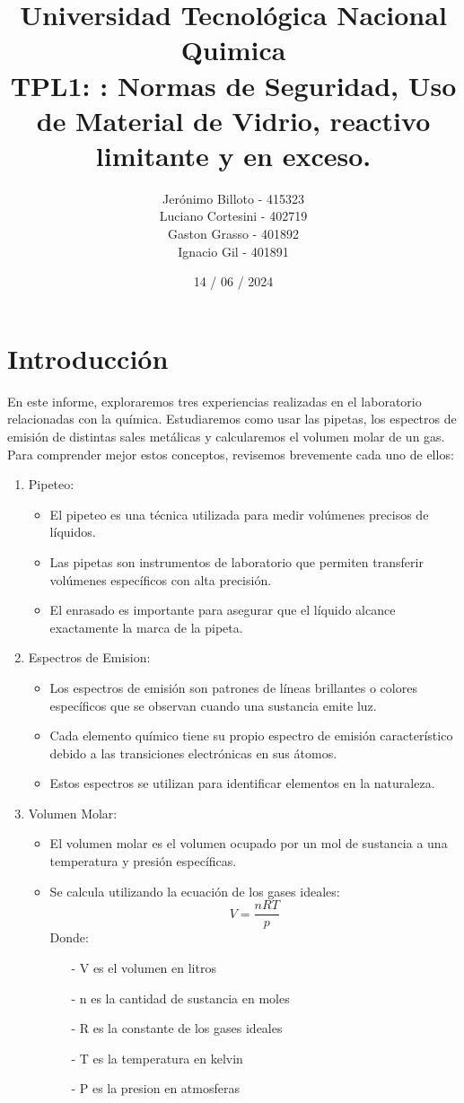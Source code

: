 \documentclass[12pt]{report}
\title{%
  \fontsize{25}{0}\selectfont Universidad Tecnológica Nacional \\
  \fontsize{22}{30}\selectfont Quimica \\
  \fontsize{18}{25}\selectfont TPL1: : Normas de Seguridad, Uso de Material de Vidrio, reactivo limitante y en exceso.
}
\author{
  Jerónimo Billoto - 415323\\
  Luciano Cortesini - 402719\\
  Gaston Grasso - 401892\\
  Ignacio Gil - 401891\\
}
\date{14 / 06 / 2024}
\begin{document}
\maketitle
\section*{Introducción}
En este informe, exploraremos tres experiencias realizadas en el laboratorio relacionadas con la química. Estudiaremos como usar las pipetas, los espectros de emisión de distintas sales metálicas y calcularemos el volumen molar de un gas. Para comprender mejor estos conceptos, revisemos brevemente cada uno de ellos:

\begin{enumerate}
  \item Pipeteo:
    \begin{itemize}
      \item El pipeteo es una técnica utilizada para medir volúmenes precisos de líquidos.
      \item Las pipetas son instrumentos de laboratorio que permiten transferir volúmenes específicos con alta precisión.
      \item El enrasado es importante para asegurar que el líquido alcance exactamente la marca de la pipeta.
    \end{itemize}
  \item Espectros de Emision:
    \begin{itemize}
      \item Los espectros de emisión son patrones de líneas brillantes o colores específicos que se observan cuando una sustancia emite luz.
      \item Cada elemento químico tiene su propio espectro de emisión característico debido a las transiciones electrónicas en sus átomos.
      \item Estos espectros se utilizan para identificar elementos en la naturaleza.
    \end{itemize}
  \item Volumen Molar:
    \begin{itemize}
      \item El volumen molar es el volumen ocupado por un mol de sustancia a una temperatura y presión específicas.
      \item Se calcula utilizando la ecuación de los gases ideales:
      $$V = \frac{nRT}{p}$$
      Donde: 
      \begin{itemize}
        \item[-] V es el volumen en litros
        \item[-] n es la cantidad de sustancia en moles
        \item[-] R es la constante de los gases ideales
        \item[-] T es la temperatura en kelvin
        \item[-] P es la presion en atmosferas
      \end{itemize}
    \end{itemize}
\end{enumerate}
\end{document}
